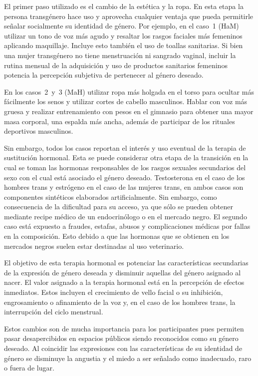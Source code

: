 El primer paso utilizado es el cambio de la estética y la ropa. En esta etapa la
persona transgénero hace uso y aprovecha cualquier ventaja que pueda permitirle
señalar socialmente su identidad de género. Por ejemplo, en el caso~1 (HaM)
utilizar un tono de voz más agudo y resaltar los rasgos faciales más femeninos
aplicando maquillaje. Incluye esto también el uso de toallas sanitarias. Si bien
una mujer transgénero no tiene menstruación ni sangrado vaginal, incluir la
rutina mensual de la adquisición y uso de productos sanitarios femeninos
potencia la percepción subjetiva de pertenecer al género deseado.

En los casos~2~y~3 (MaH) utilizar ropa más holgada en el torso para ocultar más
fácilmente los senos y utilizar cortes de cabello masculinos. Hablar con voz más
gruesa y realizar entrenamiento con pesos en el gimnasio para obtener una mayor
masa corporal, una espalda más ancha, además de participar de los rituales deportivos masculinos.

Sin embargo, todos los casos reportan el interés y uso eventual de la terapia de
sustitución hormonal. Esta se puede considerar otra etapa de la transición en la
cual se toman las hormonas responsables de los rasgos sexuales secundarios del
sexo con el cual está asociado el género deseado. Testosterona en el caso de los
hombres trans y estrógeno en el caso de las mujeres trans, en ambos casos son
componentes sintéticos elaborados artificialmente. Sin embargo, como
consecuencia de la dificultad para su acceso, ya que sólo se pueden obtener
mediante recipe médico de un endocrinólogo o en el mercado negro. El segundo
caso está expuesto a fraudes, estafas, abusos y complicaciones médicas por
fallas en la composición. Esto debido a que las hormonas que se obtienen en los
mercados negros suelen estar destinadas al uso veterinario.

El objetivo de esta terapia hormonal es potenciar las características
secundarias de la expresión de género deseada y disminuir aquellas del género
asignado al nacer. El valor asignado a la terapia hormonal está en la percepción
de efectos inmediatos. Estos incluyen el crecimiento de vello facial o su
inhibición, engrosamiento o afinamiento de la voz y, en el caso de los hombres
trans, la interrupción del ciclo menstrual.

Estos cambios son de mucha importancia para los participantes pues permiten
pasar desapercibidos en espacios públicos siendo reconocidos como su género
deseado. Al coincidir las expresiones con las características de su identidad de
género se disminuye la angustia y el miedo a ser señalado como inadecuado, raro
o fuera de lugar.


